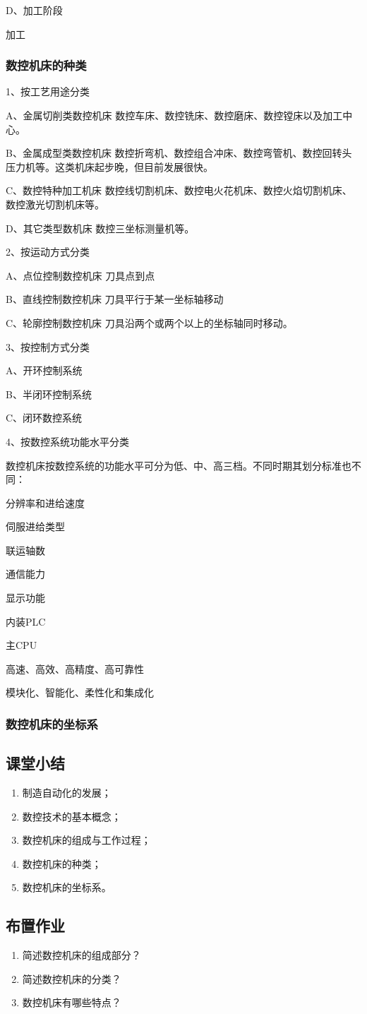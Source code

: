 D、加工阶段

加工




\subsubsection{数控机床的种类}
1、按工艺用途分类

A、金属切削类数控机床    数控车床、数控铣床、数控磨床、数控镗床以及加工中心。

B、金属成型类数控机床    数控折弯机、数控组合冲床、数控弯管机、数控回转头压力机等。这类机床起步晚，但目前发展很快。

C、数控特种加工机床    数控线切割机床、数控电火花机床、数控火焰切割机床、数控激光切割机床等。

D、其它类型数机床    数控三坐标测量机等。

2、按运动方式分类

A、点位控制数控机床    刀具点到点

B、直线控制数控机床    刀具平行于某一坐标轴移动

C、轮廓控制数控机床    刀具沿两个或两个以上的坐标轴同时移动。

3、按控制方式分类

A、开环控制系统

B、半闭环控制系统

C、闭环数控系统

4、按数控系统功能水平分类

数控机床按数控系统的功能水平可分为低、中、高三档。不同时期其划分标准也不同：

分辨率和进给速度

伺服进给类型

联运轴数

通信能力

显示功能

内装PLC

主CPU

高速、高效、高精度、高可靠性

模块化、智能化、柔性化和集成化



\subsubsection{数控机床的坐标系}
\subsection{课堂小结}
\begin{enumerate}[1、]
\item 制造自动化的发展；
\item 数控技术的基本概念；
\item 数控机床的组成与工作过程；
\item 数控机床的种类；
\item 数控机床的坐标系。
\end{enumerate}
\subsection{布置作业}
\begin{enumerate}[1、]
\item 简述数控机床的组成部分？
\item 简述数控机床的分类？
\item 数控机床有哪些特点？
\end{enumerate}
\vfill
